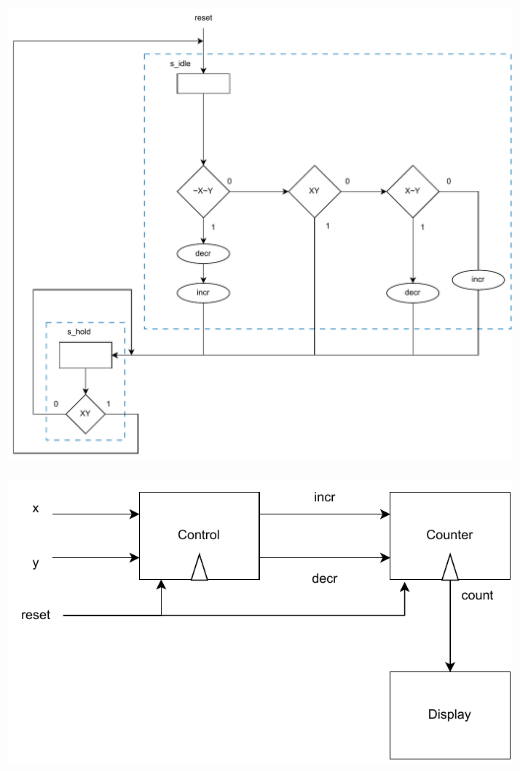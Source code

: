\documentclass[12pt]{article}
\newenvironment{explanation}{\begin{tcolorbox}[colback=blue!2!white,colframe=blue!20!white]}{\end{tcolorbox}}
\begin{document}
    \section{}
        \begin{explanation}
            \begin{center}
                \includegraphics[scale=0.7]{Images/Question 2 second try.pdf}
            \end{center}
            \begin{center}
                \includegraphics[scale=1]{Images/Question 2 datapath circuit.pdf}
            \end{center}
        \end{explanation}
        
\end{document}

